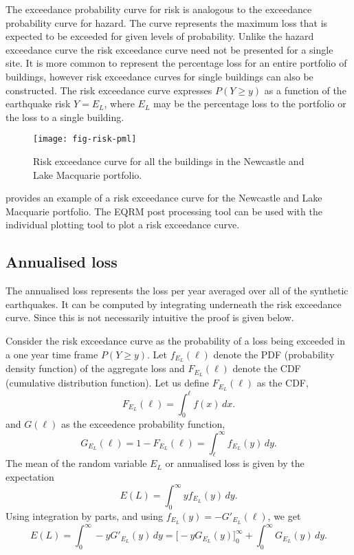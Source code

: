 The exceedance probability curve for risk is analogous to the
exceedance probability curve for hazard. The curve represents the
maximum loss that is expected to be exceeded for given levels of
probability. Unlike the hazard exceedance curve the risk
exceedance curve need not be presented for a single site. It is
more common to represent the percentage loss for an entire
portfolio of buildings, however risk exceedance curves for single
buildings can also be constructed. The risk exceedance curve
expresses $P(Y \ge y)$ as a function of the earthquake risk
$Y=E_L$, where $E_L$ may be the percentage loss to the portfolio
or the loss to a single building.
\begin{figure}
\texttt{[image: fig-risk-pml]}
\caption{Risk exceedance curve for all the buildings in the
Newcastle and Lake Macquarie portfolio.} \label{fig-risk-pml}
\end{figure}
 provides an example of a risk exceedance curve
for the Newcastle and Lake Macquarie portfolio. The EQRM post
processing tool  can be used with
the individual plotting tool  to plot a
risk exceedance curve.

\subsection{Annualised loss}

The annualised loss represents the loss per year averaged over all
of the synthetic earthquakes. It can be computed by integrating
underneath the risk exceedance curve. Since this is not
necessarily intuitive the proof is given below.

Consider the risk exceedance curve as the probability of a loss
being exceeded in a one year time frame $P(Y \ge y)$. Let
$f_{E_L}(\ell)$ denote the PDF (probability density function) of
the aggregate loss and $F_{E_L}(\ell)$ denote the CDF (cumulative
distribution function). Let us define $F_{E_L}(\ell)$ as the CDF,
$$
 F_{E_L}(\ell) = \int_0^\ell f(x)\, dx.
$$
and $G(\ell)$ as the exceedence probability function,
$$
 G_{E_L}(\ell) = 1 - F_{E_L}(\ell) = \int_\ell^\infty f_{E_L}(y)\,dy.
$$
The mean of the random variable $E_L$ or annualised loss is given
by the expectation
$$
 E(L) = \int_0^\infty y f_{E_L}(y)\,dy.
$$
Using integration by parts, and using $f_{E_L}(y) =
-G'_{E_L}(\ell)$, we get
$$
 E(L) = \int_0^\infty -y G'_{E_L}(y)\,dy
      =  \big[ -yG_{E_L}(y)\big]_0^\infty + \int_0^\infty
      G_{E_L}(y)\,dy.
$$

